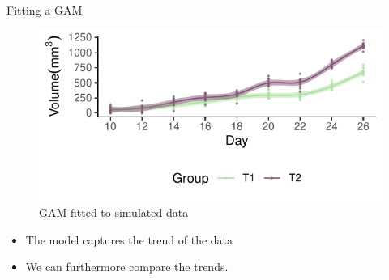 \documentclass[
  ignorenonframetext,
]{beamer}
\begin{document}
\begin{frame}{Fitting a GAM}
\protect\hypertarget{fitting-a-gam}{}
\begin{figure}

{\centering \includegraphics{MfPH_Next_Generation_AM_March_2023_files/figure-beamer/model-1.pdf}

}

\caption{GAM fitted to simulated data}

\end{figure}

\begin{itemize}[<+->]
\item
  The model captures the trend of the data
\item
  We can furthermore compare the trends.
\end{itemize}
\end{frame}
\end{document}
